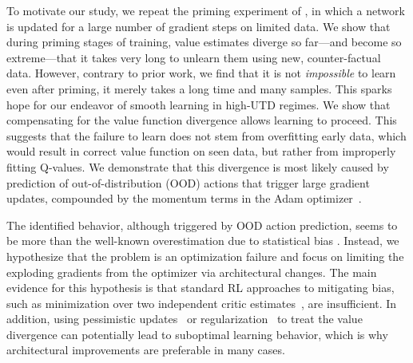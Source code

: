 To motivate our study, we repeat the priming experiment of \textcite{nikishin2022primacy}, in which a network is updated for a large number of gradient steps on limited data. We show that during priming stages of training, value estimates diverge so far---and become so extreme---that it takes very long to unlearn them using new, counter-factual 
data. However, contrary to prior work, we find that it is not \emph{impossible} to learn even after priming, it merely takes a long time and many samples. 
This sparks hope for our endeavor of smooth learning in high-UTD regimes.
We show that compensating for the value function divergence allows learning to proceed. This suggests that the failure to learn does not stem from overfitting early data, which would result in correct value function on seen data, but rather from improperly fitting Q-values. 
We demonstrate that this divergence is most likely caused by prediction of out-of-distribution (OOD) actions that trigger large gradient updates, compounded by the momentum terms in the Adam optimizer~\parencite{kingma2015adam}.

The identified behavior, although triggered by OOD action prediction, seems to be more than the well-known overestimation due to statistical bias \parencite{thrun1993issues}. 
Instead, we hypothesize that the problem is an optimization failure and focus on limiting the exploding gradients from the optimizer via architectural changes.
The main evidence for this hypothesis is that standard RL approaches to mitigating bias, such as minimization over two independent critic estimates~\parencite{fujimoto2018addressing}, are insufficient. In addition, using pessimistic updates~\parencite{fujimoto2019bcq, fujimoto2021td3bc} or regularization~\parencite{krogh1991simple, srivastava14dropout} to treat the value divergence can potentially lead to suboptimal learning behavior, which is why architectural improvements are preferable in many cases.


